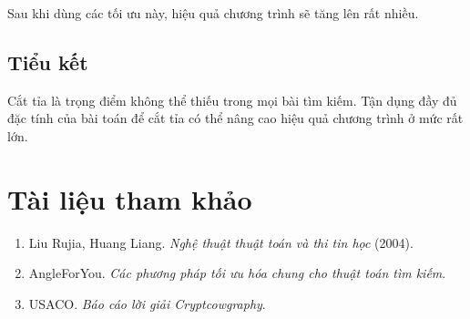 \documentclass[11pt]{article}
\begin{document}
Sau khi dùng các tối ưu này, hiệu quả chương trình sẽ tăng lên rất nhiều.

\subsection{Tiểu kết}

Cắt tỉa là trọng điểm không thể thiếu trong mọi bài tìm kiếm. Tận dụng đầy đủ
đặc tính của bài toán để cắt tỉa có thể nâng cao hiệu quả chương trình ở mức
rất lớn.

\section*{Tài liệu tham khảo}

\begin{enumerate}
  \item Liu Rujia, Huang Liang. \textit{Nghệ thuật thuật toán và thi tin học}
  (2004).
  \item AngleForYou. \textit{Các phương pháp tối ưu hóa chung cho thuật toán
  tìm kiếm}.
  \item USACO. \textit{Báo cáo lời giải Cryptcowgraphy}.
\end{enumerate}
\end{document}
